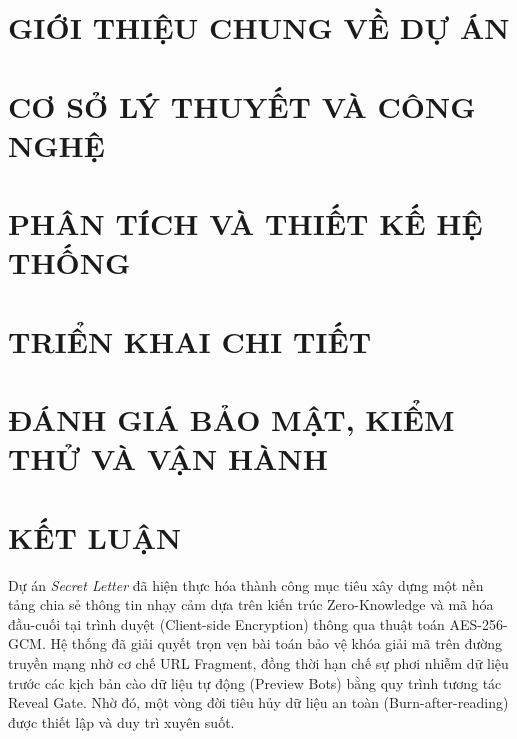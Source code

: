 \documentclass[13pt,a4paper]{extreport}
\begin{document}

\clearpage

\setcounter{page}{1}

\chapter{GIỚI THIỆU CHUNG VỀ DỰ ÁN}



\chapter{CƠ SỞ LÝ THUYẾT VÀ CÔNG NGHỆ}




\chapter{PHÂN TÍCH VÀ THIẾT KẾ HỆ THỐNG}




\chapter{TRIỂN KHAI CHI TIẾT}




\chapter{ĐÁNH GIÁ BẢO MẬT, KIỂM THỬ VÀ VẬN HÀNH}




\newpage

\chapter*{KẾT LUẬN}

Dự án \textit{Secret Letter} đã hiện thực hóa thành công mục tiêu xây dựng một nền tảng chia sẻ thông tin nhạy cảm dựa trên kiến trúc Zero-Knowledge và mã hóa đầu-cuối tại trình duyệt (Client-side Encryption) thông qua thuật toán AES-256-GCM. Hệ thống đã giải quyết trọn vẹn bài toán bảo vệ khóa giải mã trên đường truyền mạng nhờ cơ chế URL Fragment, đồng thời hạn chế sự phơi nhiễm dữ liệu trước các kịch bản cào dữ liệu tự động (Preview Bots) bằng quy trình tương tác Reveal Gate. Nhờ đó, một vòng đời tiêu hủy dữ liệu an toàn (Burn-after-reading) được thiết lập và duy trì xuyên suốt.
\end{document}
